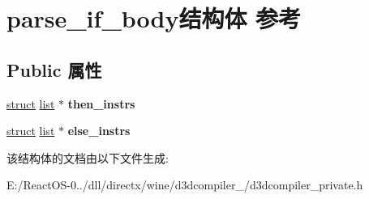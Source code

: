 \hypertarget{structparse__if__body}{}\section{parse\+\_\+if\+\_\+body结构体 参考}
\label{structparse__if__body}
\subsection*{Public 属性}
\begin{DoxyCompactItemize}
\item 
\mbox{\label{structparse__if__body_ab6c734a13b8f53beb8bc59e7bedacd53}} 
\hyperlink{interfacestruct}{struct} \hyperlink{classlist}{list} $\ast$ {\bfseries then\+\_\+instrs}
\item 
\mbox{\label{structparse__if__body_a0a2f194e1184b7ff4c9a7a8ea4280d78}} 
\hyperlink{interfacestruct}{struct} \hyperlink{classlist}{list} $\ast$ {\bfseries else\+\_\+instrs}
\end{DoxyCompactItemize}


该结构体的文档由以下文件生成\+:\begin{DoxyCompactItemize}
\item 
E\+:/\+React\+O\+S-\/0../dll/directx/wine/d3dcompiler\+\_/d3dcompiler\+\_\+private.\+h\end{DoxyCompactItemize}
